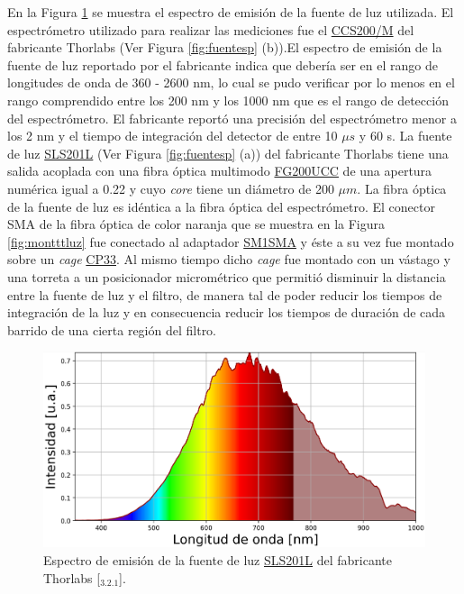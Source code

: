 En la Figura \ref{fig:espfth} se muestra el espectro de emisión de la fuente de luz utilizada.  El espectrómetro utilizado para realizar las mediciones fue el \href{https://www.thorlabs.com/thorproduct.cfm?partnumber=CCS200/M#ad-image-0}{CCS200/M} del fabricante Thorlabs (Ver Figura \ref{fig:fuentesp} (b)).El espectro de emisión de la fuente de luz reportado por el fabricante indica que debería ser en el rango de longitudes de onda de 360 - 2600 nm, lo cual se pudo verificar por lo menos en el rango comprendido entre los 200 nm y los 1000 nm que es el rango de detección del espectrómetro. El fabricante reportó una precisión del espectrómetro menor a los 2 nm y el tiempo de integración del detector de entre 10 $\mu s$ y 60 s. La fuente de luz \href{https://www.thorlabs.com/newgrouppage9.cfm?objectgroup_id=7269&pn=SLS201L/M}{SLS201L} (Ver Figura \ref{fig:fuentesp} (a)) del fabricante Thorlabs tiene una salida acoplada con una fibra óptica multimodo \href{https://www.thorlabs.com/newgrouppage9.cfm?objectgroup_id=6839&pn=FG200UCC}{FG200UCC} de una apertura numérica igual a 0.22 y cuyo \textit{core} tiene un diámetro de 200 $\mu m$. La fibra óptica de la fuente de luz es idéntica a la fibra óptica del espectrómetro. El conector SMA de la fibra óptica de color naranja que se muestra en la Figura \ref{fig:montttluz} fue conectado al adaptador \href{https://www.thorlabs.com/thorproduct.cfm?partnumber=SM1SMA\#ad-image-0}{SM1SMA} y éste a su vez fue montado sobre un \textit{cage} \href{https://www.thorlabs.com/thorproduct.cfm?partnumber=CP33}{CP33}. Al mismo tiempo dicho \textit{cage} fue montado con un vástago y una torreta a un posicionador micrométrico que permitió disminuir la distancia entre la fuente de luz y el filtro, de manera tal de poder reducir los tiempos de integración de la luz y en consecuencia reducir los tiempos de duración de cada barrido de una cierta región del filtro.

\begin{figure}[H]
	\centering
	\includegraphics[scale=0.45]{Figs/microespectrometro/espfuentethorl.png}
	\caption{Espectro de emisión de la fuente de luz \href{https://www.thorlabs.com/newgrouppage9.cfm?objectgroup\_id=7269&pn=SLS201L/M}{SLS201L} del fabricante Thorlabs [\href{https://github.com/jrr1984/defects\_analysis/blob/master/light\_sources\_spectrum.py}{\faGithub$_{3.2.1}$}].}
	\label{fig:espfth}
\end{figure}


